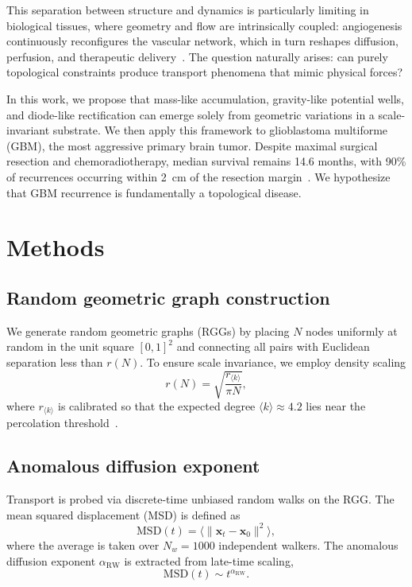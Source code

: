 \documentclass[aps,pre,twocolumn,superscriptaddress,10pt,floatfix]{revtex4-2}
\begin{document}
This separation between structure and dynamics is particularly limiting in biological tissues, where geometry and flow are intrinsically coupled: angiogenesis continuously reconfigures the vascular network, which in turn reshapes diffusion, perfusion, and therapeutic delivery~\cite{jain2001,carmeliet2011}. The question naturally arises: can purely topological constraints produce transport phenomena that mimic physical forces?

In this work, we propose that mass-like accumulation, gravity-like potential wells, and diode-like rectification can emerge solely from geometric variations in a scale-invariant substrate. We then apply this framework to glioblastoma multiforme (GBM), the most aggressive primary brain tumor. Despite maximal surgical resection and chemoradiotherapy, median survival remains 14.6 months, with 90\% of recurrences occurring within 2~cm of the resection margin~\cite{stupp2005,giese2003}. We hypothesize that GBM recurrence is fundamentally a topological disease.

\section{Methods}

\subsection{Random geometric graph construction}

We generate random geometric graphs (RGGs) by placing $N$ nodes uniformly at random in the unit square $[0,1]^2$ and connecting all pairs with Euclidean separation less than $r(N)$. To ensure scale invariance, we employ density scaling
\begin{equation}
  r(N) = \sqrt{\frac{r_{\langle k \rangle}}{\pi N}},
  \label{eq:rN}
\end{equation}
where $r_{\langle k \rangle}$ is calibrated so that the expected degree $\langle k \rangle \approx 4.2$ lies near the percolation threshold~\cite{penrose2003}.

\subsection{Anomalous diffusion exponent}

Transport is probed via discrete-time unbiased random walks on the RGG. The mean squared displacement (MSD) is defined as
\begin{equation}
  \mathrm{MSD}(t) = \big\langle \| \bm{x}_t - \bm{x}_0 \|^2 \big\rangle,
  \label{eq:msd}
\end{equation}
where the average is taken over $N_w = 1000$ independent walkers. The anomalous diffusion exponent $\alpha_{\mathrm{RW}}$ is extracted from late-time scaling,
\begin{equation}
  \mathrm{MSD}(t) \sim t^{\alpha_{\mathrm{RW}}}.
\end{equation}
\end{document}
